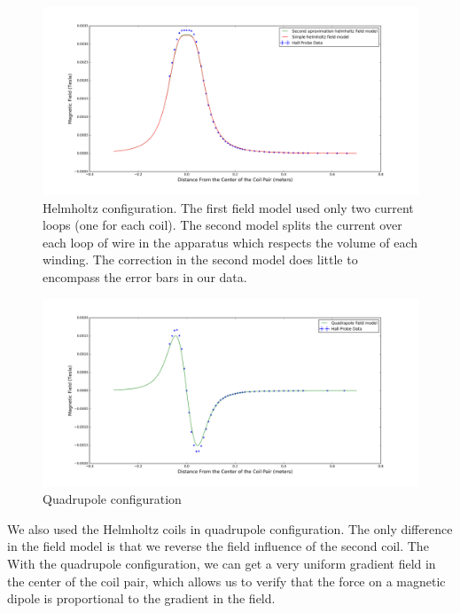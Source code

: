 \documentclass[aps,twocolumn,secnumarabic,balancelastpage,amsmath,amssymb,nofootinbib,floatfix]{revtex4-1}
\begin{document}
\begin{figure}[here]
\includegraphics[width=.97\textwidth]{../DataValidation/helmholtzPlot.png}
\caption{Helmholtz configuration. The first field model used only two current loops (one for each coil). The second model splits the current over each loop of wire in the apparatus which respects the volume of each winding. The correction in the second model does little to encompass the error bars in our data.}
\label{apparatus}
\end{figure}

\begin{figure}[here]
\includegraphics[width=.97\textwidth]{../DataValidation/quadPlot.png}
\caption{Quadrupole configuration}
\label{quadPlot}
\end{figure}

We also used the Helmholtz coils in quadrupole configuration. The only difference in the field model is that we reverse the field influence of the second coil. The  With the quadrupole configuration, we can get a very uniform gradient field in the center of the coil pair, which allows us to verify that the force on a magnetic dipole is proportional to the gradient in the field. 



\end{document}
